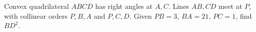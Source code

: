 Convex quadrilateral $ABCD$ has right angles at $A,C$. Lines $AB,CD$ meet at $P$, with collinear orders $P,B,A$ and $P,C,D$. Given $PB=3$, $BA=21$, $PC=1$, find $BD^2$.
